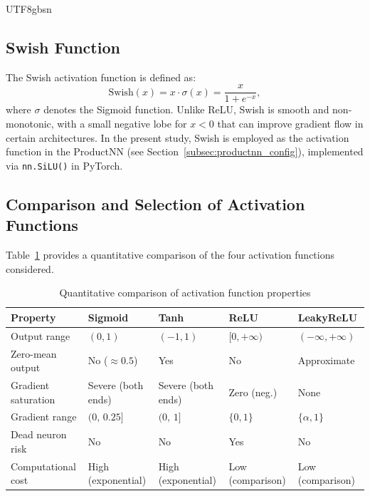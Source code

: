 \documentclass[a4paper,12pt]{report}
\begin{document}
\begin{CJK}{UTF8}{gbsn}
\subsection{Swish Function}
\label{subsec:swish}

The Swish activation function is defined as:
\begin{equation}
  \mathrm{Swish}(x) = x \cdot \sigma(x) = \frac{x}{1 + e^{-x}},
  \label{eq:swish}
\end{equation}
where $\sigma$ denotes the Sigmoid function. Unlike ReLU, Swish is smooth and
non-monotonic, with a small negative lobe for $x < 0$ that can improve gradient flow
in certain architectures. In the present study, Swish is employed as the activation
function in the ProductNN (see Section~\ref{subsec:productnn_config}), implemented
via \texttt{nn.SiLU()} in PyTorch.

\subsection{Comparison and Selection of Activation Functions}
\label{subsec:activation_comparison}

Table~\ref{tab:activation_comparison} provides a quantitative comparison of the four
activation functions considered.

\begin{table}[H]
  \centering
  \caption{Quantitative comparison of activation function properties}
  \label{tab:activation_comparison}
  \begin{tabularx}{\textwidth}{lXXXX}
    \toprule
    \textbf{Property} & \textbf{Sigmoid} & \textbf{Tanh} & \textbf{ReLU} & \textbf{LeakyReLU} \\
    \midrule
    Output range & $(0,1)$ & $(-1,1)$ & $[0,+\infty)$ & $(-\infty,+\infty)$ \\
    Zero-mean output & No ($\approx 0.5$) & Yes & No & Approximate \\
    Gradient saturation & Severe (both ends) & Severe (both ends) & Zero (neg.) & None \\
    Gradient range & $(0,\,0.25]$ & $(0,\,1]$ & $\{0,1\}$ & $\{\alpha,1\}$ \\
    Dead neuron risk & No & No & Yes & No \\
    Computational cost & High (exponential) & High (exponential) & Low (comparison) & Low (comparison) \\
    \bottomrule
  \end{tabularx}
\end{table}


\end{CJK}
\end{document}
